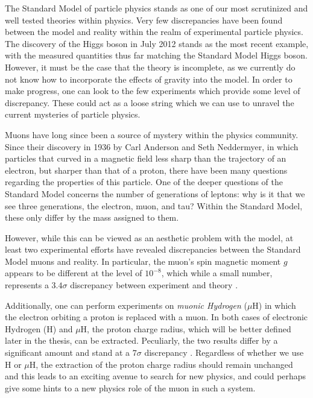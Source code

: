 \label{chapter:introduction}

The Standard Model of particle physics stands as one of our most scrutinized and well tested theories within physics. Very few discrepancies have been found between the model and reality within the realm of experimental particle physics. The discovery of the Higgs boson in July 2012 stands as the most recent example, with the measured quantities thus far matching the Standard Model Higgs boson. However, it must be the case that the theory is incomplete, as we currently do not know how to incorporate the effects of gravity into the model. In order to make progress, one can look to the few experiments which provide some level of discrepancy. These could act as a loose string which we can use to unravel the current mysteries of particle physics.

Muons have long since been a source of mystery within the physics community. Since their discovery in 1936 by Carl Anderson and Seth Neddermyer, in which particles that curved in a magnetic field less sharp than the trajectory of an electron, but sharper than that of a proton, there have been many questions regarding the properties of this particle. One of the deeper questions of the Standard Model concerns the number of generations of leptons: why is it that we see three generations, the electron, muon, and tau? Within the Standard Model, these only differ by the mass assigned to them.

However, while this can be viewed as an aesthetic problem with the model, at least two experimental efforts have revealed discrepancies between the Standard Model muons and reality. In particular, the muon's spin magnetic moment $g$ appears to be different at the level of $10^{-8}$, which while a small number, represents a $3.4\sigma$ discrepancy between experiment and theory \cite{2007PhLB..649..173H}.

Additionally, one can perform experiments on \emph{muonic Hydrogen} ($\mu\textrm{H}$) in which the electron orbiting a proton is replaced with a muon. In both cases of electronic Hydrogen (H) and $\mu\textrm{H}$, the proton charge radius, which will be better defined later in the thesis, can be extracted. Peculiarly, the two results differ by a significant amount  and stand at a $7\sigma$ discrepancy \cite{Carlson:2015jba}. Regardless of whether we use H or $\mu\textrm{H}$, the extraction of the proton charge radius should remain unchanged and this leads to an exciting avenue to search for new physics, and could perhaps give some hints to a new physics role of the muon in such a system.


